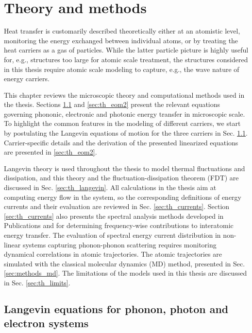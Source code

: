\chapter{Theory and methods}
\label{chap:theory}

Heat transfer is customarily described theoretically either at an atomistic level, monitoring the energy exchanged between individual atoms, or by treating the heat carriers as a gas of particles. While the latter particle picture is highly useful for, e.g., structures too large for atomic scale treatment, the structures considered in this thesis require atomic scale modeling to capture, e.g., the wave nature of energy carriers.

This chapter reviews the microscopic theory and computational methods used in the thesis. Sections \ref{sec:th_eom1} and \ref{sec:th_eom2} present the relevant equations governing phononic, electronic and photonic energy transfer in microscopic scale. To highlight the common features in the modeling of different carriers, we start by postulating the Langevin equations of motion for the three carriers in Sec. \ref{sec:th_eom1}. Carrier-specific details and the derivation of the presented linearized equations are presented in \ref{sec:th_eom2}. 

Langevin theory is used throughout the thesis to model thermal fluctuations and dissipation, and this theory and the fluctuation-dissipation theorem (FDT) are discussed in Sec. \ref{sec:th_langevin}. All calculations in the thesis aim at computing energy flow in the system, so the corresponding definitions of energy currents and their evaluation are reviewed in Sec. \ref{sec:th_currents}. Section \ref{sec:th_currents} also presents the spectral analysis methods developed in Publications  and  for determining frequency-wise contributions to interatomic energy transfer. The evaluation of spectral energy current distribution in non-linear systems capturing phonon-phonon scattering requires monitoring dynamical correlations in atomic trajectories. The atomic trajectories are simulated with the classical molecular dynamics (MD) method, presented in Sec. \ref{sec:methods_md}. The limitations of the models used in this thesis are discussed in Sec. \ref{sec:th_limits}.

\section{Langevin equations for phonon, photon and electron systems}
\label{sec:th_eom1}

